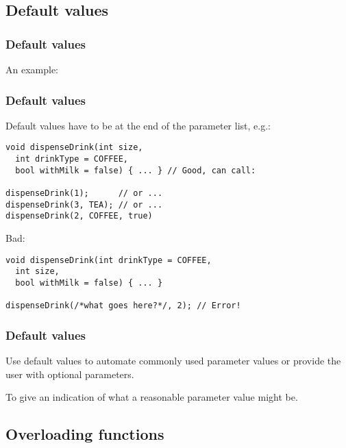 \documentclass{beamer}
\begin{document}
\subsection{Default values}

\begin{frame}[fragile]
  \frametitle{Default values}
	An example:
  
\end{frame}

\begin{frame}[fragile]
  \frametitle{Default values}
  
  Default values have to be at the end of the parameter list, e.g.:
  \begin{lstlisting}
void dispenseDrink(int size,
  int drinkType = COFFEE,
  bool withMilk = false) { ... } // Good, can call:
  
dispenseDrink(1);      // or ...
dispenseDrink(3, TEA); // or ...
dispenseDrink(2, COFFEE, true)
  \end{lstlisting}
  \pause
  Bad:
  \begin{lstlisting}
void dispenseDrink(int drinkType = COFFEE,
  int size,
  bool withMilk = false) { ... }
  
dispenseDrink(/*what goes here?*/, 2); // Error!
  \end{lstlisting}
\end{frame}

\begin{frame}[fragile]
  \frametitle{Default values}
  
  \begin{doblocke}
    \begin{doitemize}
      \item{Use default values to automate commonly used parameter values or provide the user with optional parameters.}
      \pause
      \item{To give an indication of what a reasonable parameter value might be.}
    \end{doitemize}
  \end{doblocke}
\end{frame}

\subsection{Overloading functions}
\end{document}
